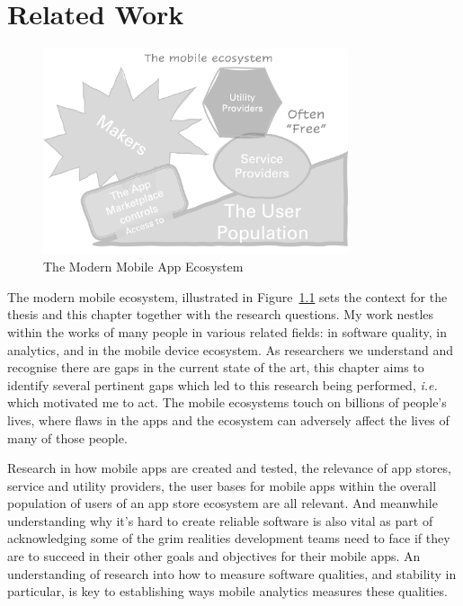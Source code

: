 \chapter{Related Work}
\label{chapter-related-work}


\begin{figure}
    \centering
    \includegraphics[width=0.8\textwidth]{images/my/the_mobile_ecosystem_sketch.png}
    \caption{The Modern Mobile App Ecosystem}
    \label{fig:my_modern-mobile-app-ecosystem}
\end{figure}

The modern mobile ecosystem, illustrated in Figure~\ref{fig:my_modern-mobile-app-ecosystem} sets the context for the thesis and this chapter together with the research questions. 
My work nestles within the works of many people in various related fields: in software quality, in analytics, and in the mobile device ecosystem. As researchers we understand and recognise there are gaps in the current state of the art, this chapter aims to identify several pertinent gaps which led to this research being performed, \emph{i.e.} which motivated me to act. The mobile ecosystems touch on billions of people's lives, where flaws in the apps and the ecosystem can adversely affect the lives of many of those people. 

Research in how mobile apps are created and tested, the relevance of app stores, service and utility providers, the user bases for mobile apps within the overall population of users of an app store ecosystem are all relevant. And meanwhile understanding why it's hard to create reliable software is also vital as part of acknowledging some of the grim realities development teams need to face if they are to succeed in their other goals and objectives for their mobile apps. An understanding of research into how to measure software qualities, and stability in particular, is key to establishing ways mobile analytics measures these qualities. 

